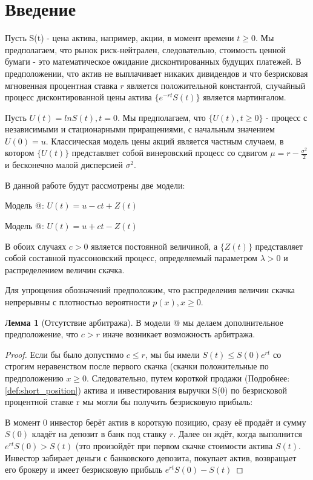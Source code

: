 \documentclass[a4paper,12pt]{article}
\makeatletter
\theoremstyle{definition}
\newtheorem{lemma}{Лемма}
\newcommand*{\rom}[1]{\expandafter\@slowromancap\romannumeral #1@}
\makeatother
\begin{document}

\section{Введение}

Пусть S(t) - цена актива, например, акции, в момент времени $t \ge 0$. Мы предполагаем, что рынок риск-нейтрален, следовательно, стоимость ценной бумаги - это математическое ожидание дисконтированных будущих платежей. В предположении, что актив не выплачивает никаких дивидендов и что безрисковая мгновенная процентная ставка $r$ является положительной константой, случайный процесс дисконтированной цены актива $\{e^{-rt} S(t)\}$ является мартингалом.

Пусть $U(t) = ln S(t), t = 0$. Мы предполагаем, что $\{U(t), t \ge 0\}$ - процесс с независимыми и стационарными приращениями, с начальным значением $U(0) = u$. Классическая модель цены акций является частным случаем, в котором $\{U(t)\}$ представляет собой винеровский процесс со сдвигом $\mu = r - \frac{\sigma ^ {2}}{2}$ и бесконечно малой дисперсией $\sigma ^ {2}$. 

В данной работе будут рассмотрены две модели:

Модель \rom{1}: $U(t) = u - ct + Z(t)$

Модель \rom{2}: $U(t) = u + ct - Z(t)$

В обоих случаях $c > 0$ является постоянной величиной, а $\{Z(t)\}$ представляет собой составной пуассоновский процесс, определяемый параметром $\lambda > 0$ и распределением величин скачка. 

\label{sec:positivityOfJumsAssumption} Для упрощения обозначений предположим, что распределения величин скачка
непрерывны с плотностью вероятности $p(x), x \ge 0$. 

\begin{lemma}[Отсутствие арбитража]\label{thm:no_arbitrage_theoreme}
В модели \rom{2} мы делаем дополнительное предположение, что $c > r$ иначе возникает возможность арбитража. 
\end{lemma}
\begin{proof}
Если бы было допустимо $c \le r$, мы бы имели $S(t) \le S(0)e^{rt}$ со строгим неравенством после первого скачка (скачки положительные по предположению $x \ge 0$. Следовательно, путем короткой продажи (Подробнее: \autoref{def:short_position}) актива и инвестирования выручки S(0) по безрисковой процентной ставке r мы могли бы получить безрисковую прибыль:

В момент 0 инвестор берёт актив в короткую позицию, сразу её продаёт и сумму $S(0)$ кладёт на депозит в банк под ставку $r$. Далее он ждёт, когда выполнится $e^{rt} S(0) > S(t)$ (это произойдёт при первом скачке стоимости актива $S(t)$. Инвестор забирает деньги с банковского депозита, покупает актив, возвращает его брокеру и имеет безрисковую прибыль $e^{rt}S(0) - S(t)$
\end{proof}
\end{document}
